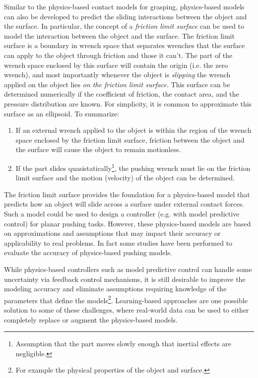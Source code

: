 Similar to the physics-based contact models for grasping, physics-based models can also be developed to predict the sliding interactions between the object and the surface. In particular, the concept of a \textit{friction limit surface}\cite{KaoLynchBurdick2016} can be used to model the interaction between the object and the surface. The friction limit surface is a boundary in wrench space that separates wrenches that the surface can apply to the object through friction and those it can't. The part of the wrench space enclosed by this surface will contain the origin (i.e. the zero wrench), and most importantly whenever the object is \textit{slipping} the wrench applied on the object lies \textit{on the friction limit surface}. This surface can be determined numerically if the coefficient of friction, the contact area, and the pressure distribution are known. For simplicity, it is common to approximate this surface as an ellipsoid. To summarize:
\begin{enumerate}
    \item If an external wrench applied to the object is within the region of the wrench space enclosed by the friction limit surface, friction between the object and the surface will cause the object to remain motionless.
    \item If the part slides quasistatically\footnote{Assumption that the part moves slowly enough that inertial effects are negligible.}, the pushing wrench must lie on the friction limit surface and the motion (velocity) of the object can be determined.
\end{enumerate}

The friction limit surface provides the foundation for a physics-based model that predicts how an object will slide across a surface under external contact forces. Such a model could be used to design a controller (e.g. with model predictive control) for planar pushing tasks. However, these physics-based models are based on approximations and assumptions that may impact their accuracy or applicability to real problems. In fact some studies have been performed to evaluate the accuracy of physics-based pushing models\cite{YuBauzaEtAl2016}.

While physics-based controllers such as model predictive control can handle some uncertainty via feedback control mechanisms, it is still desirable to improve the modeling accuracy and eliminate assumptions requiring knowledge of the parameters that define the models\footnote{For example the physical properties of the object and surface.}. Learning-based approaches are one possible solution to some of these challenges, where real-world data can be used to either completely replace or augment the physics-based models.

